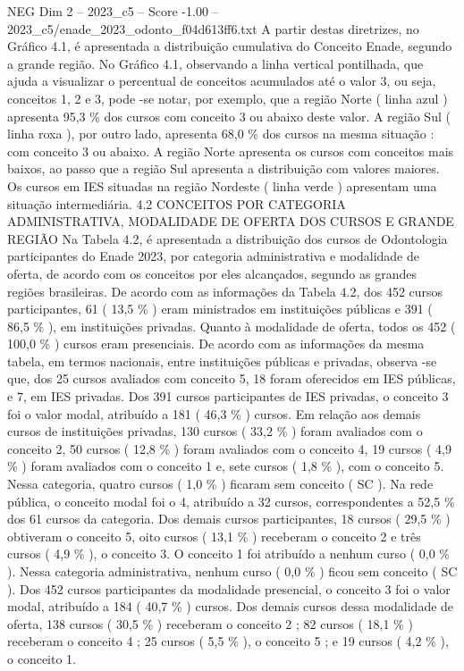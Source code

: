 \begin{textsample}{NEG Dim 2 – 2023\_c5 – Score -1.00 – 2023\_c5/enade\_2023\_odonto\_f04d613ff6.txt}
A partir destas diretrizes, no Gráfico 4.1, é apresentada a distribuição cumulativa do Conceito Enade, segundo a grande região.
No Gráfico 4.1, observando a linha vertical pontilhada, que ajuda a visualizar o percentual de conceitos acumulados até o valor 3, ou seja, conceitos 1, 2 e 3, pode -se notar, por exemplo, que a região Norte ( linha azul ) apresenta 95,3 \% dos cursos com conceito 3 ou abaixo deste valor.
A região Sul ( linha roxa ), por outro lado, apresenta 68,0 \% dos cursos na mesma situação : com conceito 3 ou abaixo.
A região Norte apresenta os cursos com conceitos mais baixos, ao passo que a região Sul apresenta a distribuição com valores maiores.
Os cursos em IES situadas na região Nordeste ( linha verde ) apresentam uma situação intermediária. 4.2 CONCEITOS POR CATEGORIA ADMINISTRATIVA, MODALIDADE DE OFERTA DOS CURSOS E GRANDE REGIÃO Na Tabela 4.2, é apresentada a distribuição dos cursos de Odontologia participantes do Enade 2023, por categoria administrativa e modalidade de oferta, de acordo com os conceitos por eles alcançados, segundo as grandes regiões brasileiras.
De acordo com as informações da Tabela 4.2, dos 452 cursos participantes, 61 ( 13,5 \% ) eram ministrados em instituições públicas e 391 ( 86,5 \% ), em instituições privadas.
Quanto à modalidade de oferta, todos os 452 ( 100,0 \% ) cursos eram presenciais.
De acordo com as informações da mesma tabela, em termos nacionais, entre instituições públicas e privadas, observa -se que, dos 25 cursos avaliados com conceito 5, 18 foram oferecidos em IES públicas, e 7, em IES privadas.
Dos 391 cursos participantes de IES privadas, o conceito 3 foi o valor modal, atribuído a 181 ( 46,3 \% ) cursos.
Em relação aos demais cursos de instituições privadas, 130 cursos ( 33,2 \% ) foram avaliados com o conceito 2, 50 cursos ( 12,8 \% ) foram avaliados com o conceito 4, 19 cursos ( 4,9 \% ) foram avaliados com o conceito 1 e, sete cursos ( 1,8 \% ), com o conceito 5.
Nessa categoria, quatro cursos ( 1,0 \% ) ficaram sem conceito ( SC ).
Na rede pública, o conceito modal foi o 4, atribuído a 32 cursos, correspondentes a 52,5 \% dos 61 cursos da categoria.
Dos demais cursos participantes, 18 cursos ( 29,5 \% ) obtiveram o conceito 5, oito cursos ( 13,1 \% ) receberam o conceito 2 e três cursos ( 4,9 \% ), o conceito 3.
O conceito 1 foi atribuído a nenhum curso ( 0,0 \% ).
Nessa categoria administrativa, nenhum curso ( 0,0 \% ) ficou sem conceito ( SC ).
Dos 452 cursos participantes da modalidade presencial, o conceito 3 foi o valor modal, atribuído a 184 ( 40,7 \% ) cursos.
Dos demais cursos dessa modalidade de oferta, 138 cursos ( 30,5 \% ) receberam o conceito 2 ; 82 cursos ( 18,1 \% ) receberam o conceito 4 ; 25 cursos ( 5,5 \% ), o conceito 5 ; e 19 cursos ( 4,2 \% ), o conceito 1.

\end{textsample}
